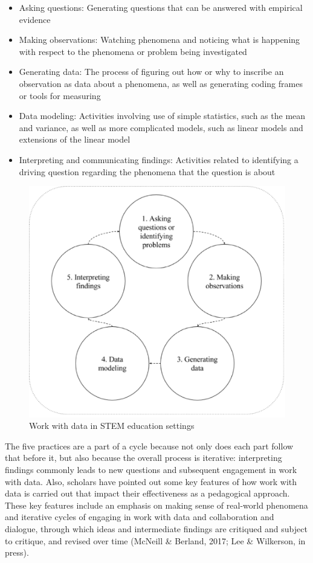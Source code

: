 \documentclass[]{book}
\providecommand{\tightlist}{%
  \setlength{\itemsep}{0pt}\setlength{\parskip}{0pt}}
\theoremstyle{definition}
\theoremstyle{definition}
\theoremstyle{definition}
\theoremstyle{remark}
\begin{document}
\begin{itemize}
\tightlist
\item
  Asking questions: Generating questions that can be answered with
  empirical evidence
\item
  Making observations: Watching phenomena and noticing what is happening
  with respect to the phenomena or problem being investigated
\item
  Generating data: The process of figuring out how or why to inscribe an
  observation as data about a phenomena, as well as generating coding
  frames or tools for measuring
\item
  Data modeling: Activities involving use of simple statistics, such as
  the mean and variance, as well as more complicated models, such as
  linear models and extensions of the linear model
\item
  Interpreting and communicating findings: Activities related to
  identifying a driving question regarding the phenomena that the
  question is about
\end{itemize}

\begin{figure}

{\centering \includegraphics[width=0.8\linewidth]{images/figure1} 

}

\caption{Work with data in STEM education settings}\label{fig:unnamed-chunk-1}
\end{figure}

The five practices are a part of a cycle because not only does each part
follow that before it, but also because the overall process is
iterative: interpreting findings commonly leads to new questions and
subsequent engagement in work with data. Also, scholars have pointed out
some key features of how work with data is carried out that impact their
effectiveness as a pedagogical approach. These key features include an
emphasis on making sense of real-world phenomena and iterative cycles of
engaging in work with data and collaboration and dialogue, through which
ideas and intermediate findings are critiqued and subject to critique,
and revised over time (McNeill \& Berland, 2017; Lee \& Wilkerson, in
press).
\end{document}

